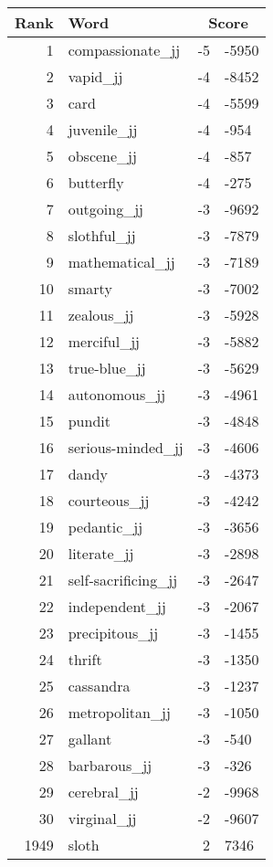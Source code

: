 \begin{longtable}[!htbp]{| rlr@{.}l |}
    \hline
    \textbf{Rank} & \textbf{Word} & \multicolumn{2}{c|}{\textbf{Score}} \\
    \hline
    \endhead
    1 & compassionate\_jj & -5 & -5950 \\
    2 & vapid\_jj & -4 & -8452 \\
    3 & card & -4 & -5599 \\
    4 & juvenile\_jj & -4 & -954 \\
    5 & obscene\_jj & -4 & -857 \\
    6 & butterfly & -4 & -275 \\
    7 & outgoing\_jj & -3 & -9692 \\
    8 & slothful\_jj & -3 & -7879 \\
    9 & mathematical\_jj & -3 & -7189 \\
    10 & smarty & -3 & -7002 \\
    11 & zealous\_jj & -3 & -5928 \\
    12 & merciful\_jj & -3 & -5882 \\
    13 & true-blue\_jj & -3 & -5629 \\
    14 & autonomous\_jj & -3 & -4961 \\
    15 & pundit & -3 & -4848 \\
    16 & serious-minded\_jj & -3 & -4606 \\
    17 & dandy & -3 & -4373 \\
    18 & courteous\_jj & -3 & -4242 \\
    19 & pedantic\_jj & -3 & -3656 \\
    20 & literate\_jj & -3 & -2898 \\
    21 & self-sacrificing\_jj & -3 & -2647 \\
    22 & independent\_jj & -3 & -2067 \\
    23 & precipitous\_jj & -3 & -1455 \\
    24 & thrift & -3 & -1350 \\
    25 & cassandra & -3 & -1237 \\
    26 & metropolitan\_jj & -3 & -1050 \\
    27 & gallant & -3 & -540 \\
    28 & barbarous\_jj & -3 & -326 \\
    29 & cerebral\_jj & -2 & -9968 \\
    30 & virginal\_jj & -2 & -9607 \\
    1949 & sloth & 2 & 7346 \\

\end{longtable}
